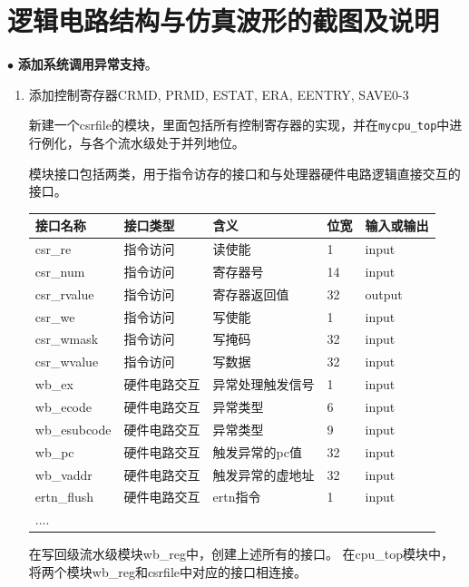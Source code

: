 \documentclass[11pt]{article}
\begin{document}


\section{逻辑电路结构与仿真波形的截图及说明}
\noindent
$\bullet$
\textbf{添加系统调用异常支持}。
\begin{enumerate}
  \item 添加控制寄存器CRMD, PRMD, ESTAT, ERA, EENTRY, SAVE0-3
  
  新建一个csrfile的模块，里面包括所有控制寄存器的实现，并在\verb|mycpu_top|中进行例化，与各个流水级处于并列地位。

  模块接口包括两类，用于指令访存的接口和与处理器硬件电路逻辑直接交互的接口。

  \begin{table}[!ht]
    \centering
    \begin{tabular}{|l|l|l|l|l|}
    \hline
        接口名称 & 接口类型 & 含义 & 位宽 & 输入或输出 \\ \hline
        csr\_re & 指令访问 & 读使能 & 1 & input \\ \hline
        csr\_num & 指令访问 & 寄存器号 & 14 & input \\ \hline
        csr\_rvalue & 指令访问 & 寄存器返回值 & 32 & output \\ \hline
        csr\_we & 指令访问 & 写使能 & 1 & input \\ \hline
        csr\_wmask & 指令访问 & 写掩码 & 32 & input \\ \hline
        csr\_wvalue & 指令访问 & 写数据 & 32 & input \\ \hline
        wb\_ex & 硬件电路交互 & 异常处理触发信号 & 1 & input \\ \hline
        wb\_ecode & 硬件电路交互 & 异常类型 & 6 & input \\ \hline
        wb\_esubcode & 硬件电路交互 & 异常类型 & 9 & input \\ \hline
        wb\_pc & 硬件电路交互 & 触发异常的pc值 & 32 & input \\ \hline
        wb\_vaddr & 硬件电路交互 & 触发异常的虚地址 & 32 & input \\ \hline
        ertn\_flush & 硬件电路交互 & ertn指令 & 1 & input \\ \hline
        .... & ~ & ~ & ~ & ~ \\ \hline
    \end{tabular}
\end{table}
在写回级流水级模块wb\_reg中，创建上述所有的接口。
在cpu\_top模块中，将两个模块wb\_reg和csrfile中对应的接口相连接。


\end{enumerate}
\end{document}
